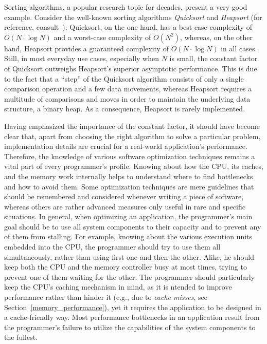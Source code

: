 Sorting algorithms, a popular research topic for decades, present a very good example. Consider the well-known sorting algorithms \emph{Quicksort} and \emph{Heapsort} (for reference, consult~\cite[pp. 113--122, 144--148]{knuth1998art}): Quicksort, on the one hand, has a best-case complexity of $O(N\cdot \log{N})$ and a worst-case complexity of $O(N^{2})$, whereas, on the other hand, Heapsort provides a guaranteed complexity of $O(N\cdot \log{N})$ in all cases. Still, in most everyday use cases, especially when $N$ is small, the constant factor of Quicksort outweighs Heapsort's superior asymptotic performance. This is due to the fact that a ``step'' of the Quicksort algorithm consists of only a single comparison operation and a few data movements, whereas Heapsort requires a multitude of comparisons and moves in order to maintain the underlying data structure, a binary heap. As a consequence, Heapsort is rarely implemented.

Having emphasized the importance of the constant factor, it should have become clear that, apart from choosing the right algorithm to solve a particular problem, implementation details are crucial for a real-world application's performance. Therefore, the knowledge of various software optimization techniques remains a vital part of every programmer's profile. Knowing about how the CPU, its caches, and the memory work internally helps to understand where to find bottlenecks and how to avoid them. Some optimization techniques are mere guidelines that should be remembered and considered whenever writing a piece of software, whereas others are rather advanced measures only useful in rare and specific situations. In general, when optimizing an application, the programmer's main goal should be to use all system components to their capacity and to prevent any of them from stalling. For example, knowing about the various execution units embedded into the CPU, the programmer should try to use them all simultaneously, rather than using first one and then the other. Alike, he should keep both the CPU and the memory controller busy at most times, trying to prevent one of them waiting for the other. The programmer should particularly keep the CPU's caching mechanism in mind, as it is ntended to improve performance rather than hinder it (e.g., due to \emph{cache misses}, see Section~\ref{memory_performance}), yet it requires the application to be designed in a cache-friendly way. Most performance bottlenecks in an application result from the programmer's failure to utilize the capabilities of the system components to the fullest.

